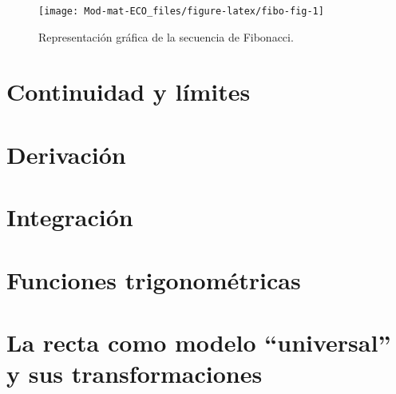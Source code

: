 \documentclass[
]{book}
\begin{document}
\begin{figure}

{\centering \texttt{[image: Mod-mat-ECO\_files/figure-latex/fibo-fig-1]} 

}

\caption{Representación gráfica de la secuencia de Fibonacci.}\label{fig:fibo-fig}
\end{figure}

\hypertarget{continuidad-y-luxedmites}{%
\section{Continuidad y límites}\label{continuidad-y-luxedmites}}

\hypertarget{derivaciuxf3n}{%
\section{Derivación}\label{derivaciuxf3n}}

\hypertarget{integraciuxf3n}{%
\section{Integración}\label{integraciuxf3n}}

\hypertarget{funciones-trigonomuxe9tricas-1}{%
\section{Funciones trigonométricas}\label{funciones-trigonomuxe9tricas-1}}

\hypertarget{la-recta-como-modelo-universal-y-sus-transformaciones-1}{%
\section{La recta como modelo ``universal'' y sus transformaciones}\label{la-recta-como-modelo-universal-y-sus-transformaciones-1}}

  
\end{document}
